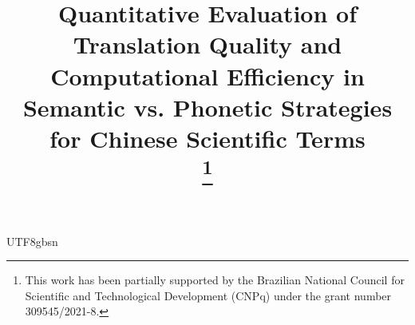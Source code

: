 \documentclass[conference]{IEEEtran}
\begin{document}
\begin{CJK*}{UTF8}{gbsn}%

\title{Quantitative Evaluation of Translation Quality and Computational Efficiency in Semantic vs. Phonetic Strategies for Chinese Scientific Terms\\


\thanks{This work has been partially supported by the Brazilian National Council for Scientific and Technological Development (CNPq) under the grant number 309545/2021-8.
}
}

\author{
\and


\and
{}


}

\maketitle


\end{CJK*}
\end{document}
